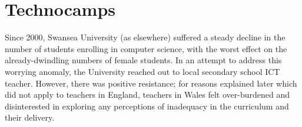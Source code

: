 \documentclass{sig-alternate}
\begin{document}







\section{Technocamps}\label{technocamps}
Since 2000, Swansea University (as elsewhere) suffered a steady decline
in the number of students enrolling in computer science,
with the worst effect on the already-dwindling numbers of female students.
In an attempt to address this worrying anomaly, the University
reached out to local secondary school ICT teacher.
However, there was positive resistance;
for reasons explained later which did not apply to
teachers in England, teachers in Wales felt
over-burdened and disinterested in exploring any perceptions of
inadequacy in the curriculum and their
delivery.
\end{document}
